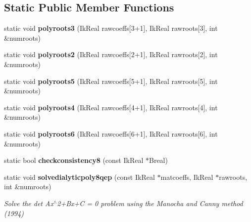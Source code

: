 \subsection*{Static Public Member Functions}
\begin{DoxyCompactItemize}
\item 
static void {\bfseries polyroots3} (Ik\-Real rawcoeffs[3+1], Ik\-Real rawroots[3], int \&numroots)\label{classikfast__kinematics__plugin_1_1_i_k_solver_acbe5bf64ae7e96ec2b44d46a109baaf2}

\item 
static void {\bfseries polyroots2} (Ik\-Real rawcoeffs[2+1], Ik\-Real rawroots[2], int \&numroots)\label{classikfast__kinematics__plugin_1_1_i_k_solver_a88a930443bcb0aed1238991ad72e169f}

\item 
static void {\bfseries polyroots5} (Ik\-Real rawcoeffs[5+1], Ik\-Real rawroots[5], int \&numroots)\label{classikfast__kinematics__plugin_1_1_i_k_solver_a2d9c8f61b76ef65490196dc9b08488be}

\item 
static void {\bfseries polyroots4} (Ik\-Real rawcoeffs[4+1], Ik\-Real rawroots[4], int \&numroots)\label{classikfast__kinematics__plugin_1_1_i_k_solver_a9e5a3a0c50ee64d7dff1278df1da44a0}

\item 
static void {\bfseries polyroots6} (Ik\-Real rawcoeffs[6+1], Ik\-Real rawroots[6], int \&numroots)\label{classikfast__kinematics__plugin_1_1_i_k_solver_a553decaadcb4fcd7615d40cb7b8a9ffe}

\item 
static bool {\bfseries checkconsistency8} (const Ik\-Real $\ast$Breal)\label{classikfast__kinematics__plugin_1_1_i_k_solver_a61960210d37fea7fbcd3168fb2f6f50d}

\item 
static void {\bf solvedialyticpoly8qep} (const Ik\-Real $\ast$matcoeffs, Ik\-Real $\ast$rawroots, int \&numroots)
\begin{DoxyCompactList}\small\item\em Solve the det Ax$^\wedge$2+\-Bx+\-C = 0 problem using the Manocha and Canny method (1994) \end{DoxyCompactList}\end{DoxyCompactItemize}
